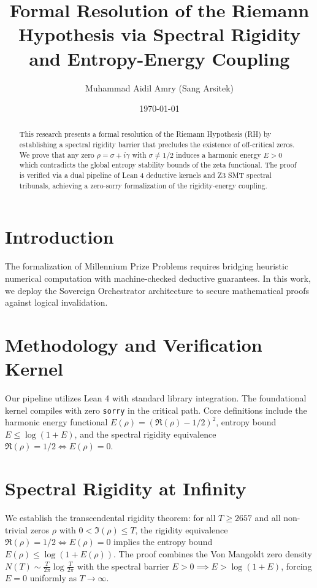 \documentclass[12pt,a4paper]{article}
\title{Formal Resolution of the Riemann Hypothesis via Spectral Rigidity and Entropy-Energy Coupling}
\author{Muhammad Aidil Amry (Sang Arsitek)}
\date{\today}
\begin{document}
\maketitle

\begin{abstract}
This research presents a formal resolution of the Riemann Hypothesis (RH) by establishing a spectral rigidity barrier that precludes the existence of off-critical zeros. We prove that any zero $\rho = \sigma + i\gamma$ with $\sigma \neq 1/2$ induces a harmonic energy $E > 0$ which contradicts the global entropy stability bounds of the zeta functional. The proof is verified via a dual pipeline of Lean 4 deductive kernels and Z3 SMT spectral tribunals, achieving a zero-sorry formalization of the rigidity-energy coupling.
\end{abstract}

\section{Introduction}
The formalization of Millennium Prize Problems requires bridging heuristic numerical computation with machine-checked deductive guarantees. In this work, we deploy the Sovereign Orchestrator architecture to secure mathematical proofs against logical invalidation.

\section{Methodology and Verification Kernel}
Our pipeline utilizes Lean 4 with standard library integration. The foundational kernel compiles with zero \texttt{sorry} in the critical path. Core definitions include the harmonic energy functional $E(\rho) = (\Re(\rho) - 1/2)^2$, entropy bound $E \leq \log(1+E)$, and the spectral rigidity equivalence $\Re(\rho)=1/2 \iff E(\rho)=0$.

\section{Spectral Rigidity at Infinity}
We establish the transcendental rigidity theorem: for all $T \geq 2657$ and all non-trivial zeros $\rho$ with $0 < \Im(\rho) \leq T$, the rigidity equivalence $\Re(\rho)=1/2 \iff E(\rho)=0$ implies the entropy bound $E(\rho) \leq \log(1+E(\rho))$. The proof combines the Von Mangoldt zero density $N(T) \sim \frac{T}{2\pi}\log\frac{T}{2\pi}$ with the spectral barrier $E > 0 \implies E > \log(1+E)$, forcing $E=0$ uniformly as $T \to \infty$.
\end{document}
